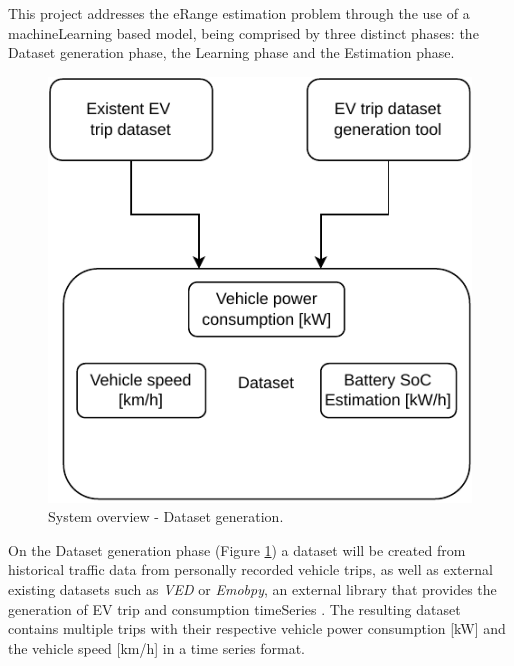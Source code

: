 This project addresses the \gls{eRange} estimation
problem through the use of a \gls{machineLearning}
based model, being comprised by three distinct phases: 
the Dataset generation phase, the Learning phase
and the Estimation phase.

\begin{figure}[H]
    \begin{center}
        \includegraphics[scale=1.0]{../figures/generic_diagram_dataset_generation_phase}
        \caption{System overview - Dataset generation.}
        \label{fig:generic_diagram_dataset_generation_phase}
    \end{center}
\end{figure}

On the Dataset generation phase
(Figure \ref{fig:generic_diagram_dataset_generation_phase})
a \gls{dataset} will be created from historical traffic data
from personally recorded vehicle trips, as well as
external existing \glspl{dataset} such as \textit{VED} 
\citep{vedDataset} or \textit{Emobpy}, an external 
library that provides the generation of \gls{EV} 
trip and consumption \gls{timeSeries} \citep{emobpy}.
The resulting dataset contains multiple
trips with their respective vehicle power consumption [kW]
and the vehicle speed [km/h] in a time series format.

